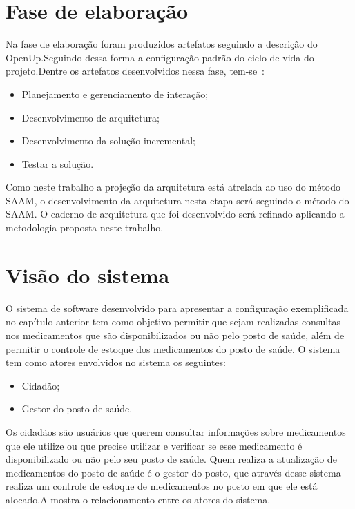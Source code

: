 \section{Fase de elaboração}
Na fase de elaboração foram produzidos artefatos seguindo a descrição do \acrfull{OpenUp}.Seguindo dessa forma a configuração padrão do ciclo de vida do projeto.Dentre os artefatos desenvolvidos nessa fase, tem-se~\cite{openup}:

\begin{itemize}
    \item Planejamento e gerenciamento de interação;
    \item Desenvolvimento de arquitetura;
    \item Desenvolvimento da solução incremental;
    \item Testar a solução.
\end{itemize}

Como neste trabalho a projeção da arquitetura está atrelada ao uso do método \acrfull{SAAM}, o desenvolvimento da arquitetura nesta etapa será seguindo o método do \acrfull{SAAM}. O caderno de arquitetura que foi desenvolvido será refinado aplicando a metodologia proposta neste trabalho.

\section{Visão do sistema}
O sistema de software desenvolvido para apresentar a configuração exemplificada no capítulo anterior tem como
objetivo permitir que sejam realizadas consultas nos medicamentos que são disponibilizados ou não pelo posto de saúde, além de permitir o controle de estoque dos medicamentos do posto de saúde.
O sistema tem como atores envolvidos no sistema os seguintes:
\begin{itemize}
    \item Cidadão;
    \item Gestor do posto de saúde.
\end{itemize}

Os cidadãos são usuários que querem consultar informações sobre medicamentos que ele utilize ou que precise utilizar e verificar se esse medicamento é disponibilizado ou não pelo seu posto de saúde. Quem realiza a atualização de medicamentos do posto de saúde é o gestor do posto, que através desse sistema realiza um controle de estoque de medicamentos no posto em que ele está alocado.A  mostra o relacionamento entre os atores do sistema.

